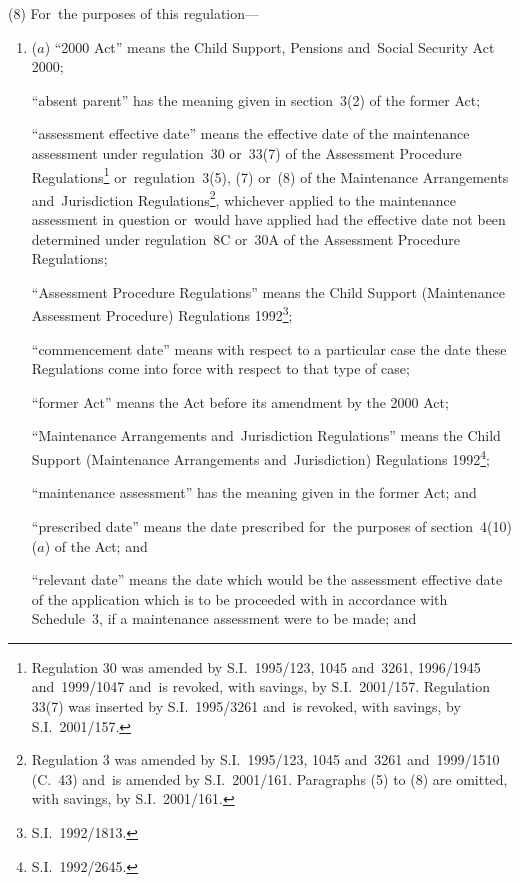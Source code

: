 \documentclass[12pt,a4paper]{article}
\begin{document}
(8) For~the purposes of this regulation—
\begin{enumerate}\item[]($a$) “2000 Act” means the Child Support, Pensions and~Social Security Act 2000;

“absent parent” has the meaning given in section~3(2) of the former Act;

“assessment effective date” means the effective date of the maintenance assessment under regulation~30 or~33(7) of the Assessment Procedure Regulations\footnote{Regulation 30 was amended by S.I.~1995/123, 1045 and~3261, 1996/1945 and~1999/1047 and~is revoked, with savings, by S.I.~2001/157. Regulation 33(7) was inserted by S.I.~1995/3261 and~is revoked, with savings, by S.I.~2001/157.} or~regulation~3(5), (7) or~(8) of the Maintenance Arrangements and~Jurisdiction Regulations\footnote{Regulation 3 was amended by S.I.~1995/123, 1045 and~3261 and~1999/1510 (C.\ 43) and~is amended by S.I.~2001/161. Paragraphs (5) to (8) are omitted, with savings, by S.I.~2001/161.}, whichever applied to the maintenance assessment in question or~would have applied had the effective date not been determined under regulation~8C or~30A of the Assessment Procedure Regulations;

“Assessment Procedure Regulations” means the Child Support (Maintenance Assessment Procedure) Regulations 1992\footnote{S.I.~1992/1813.};

“commencement date” means with respect to a particular case the date these Regulations come into force with respect to that type of case;

“former Act” means the Act before its amendment by the 2000 Act;

“Maintenance Arrangements and~Jurisdiction Regulations” means the Child Support (Maintenance Arrangements and~Jurisdiction) Regulations 1992\footnote{S.I.~1992/2645.};

“maintenance assessment” has the meaning given in the former Act; and

“prescribed date” means the date prescribed for~the purposes of section~4(10)($a$)  of the Act;
%
and

    “relevant date” means the date which would be the assessment effective date of the application which is to be proceeded with in accordance with Schedule~3, if a maintenance assessment were to be made;
%
and


\end{enumerate}
\end{document}
